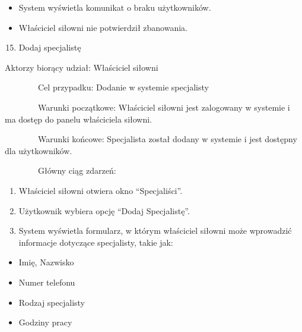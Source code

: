 \documentclass[
]{article}
\providecommand{\tightlist}{%
  \setlength{\itemsep}{0pt}\setlength{\parskip}{0pt}}
\begin{document}
\begin{itemize}
\tightlist
\item
  {System wyświetla komunikat o braku użytkowników.}
\end{itemize}

\begin{itemize}
\tightlist
\item
  {Właściciel siłowni nie potwierdził zbanowania.\\
  }
\end{itemize}

{}

{}

{}

{}

{}

{}

{}

\begin{enumerate}
\setcounter{enumi}{14}
\tightlist
\item
  {Dodaj specjalistę}
\end{enumerate}

{Aktorzy biorący udział: Właściciel siłowni}

{~~~~~~~~Cel przypadku: Dodanie w systemie specjalisty}

{~~~~~~~~Warunki początkowe: Właściciel siłowni jest zalogowany w
systemie i ma dostęp do panelu właściciela siłowni.}

{~~~~~~~~Warunki końcowe: Specjalista został dodany w systemie i jest
dostępny dla użytkowników.}

{~~~~~~~~Główny ciąg zdarzeń:}

\begin{enumerate}
\tightlist
\item
  {Właściciel siłowni otwiera okno ``Specjaliści''.}
\item
  {Użytkownik wybiera opcję ``Dodaj Specjalistę''.}
\item
  {System wyświetla formularz, w którym właściciel siłowni może
  wprowadzić informacje dotyczące specjalisty, takie jak:}
\end{enumerate}

\begin{itemize}
\tightlist
\item
  {Imię, Nazwisko}
\item
  {Numer telefonu}
\item
  {Rodzaj specjalisty}
\item
  {Godziny pracy}
\end{itemize}
\end{document}
